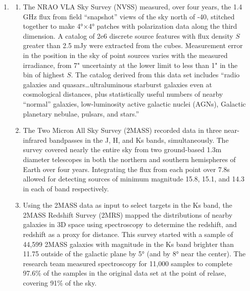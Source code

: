 \documentclass{paper}
\begin{document}
\begin{enumerate}
  \pagebreak \item
    \begin{enumerate}
      \item
        The NRAO VLA Sky Survey (NVSS) measured, over four years, the 1.4 
        GHz flux from field ``snapshot'' views of the sky north of -40, 
        stitched together to make 4°×4° patches with polarization data along 
        the third dimension. A catalog of 2e6 discrete source features with 
        flux density $S$ greater than 2.5 mJy were extracted from the cubes. 
        Measurement error in the position in the sky of point sources varies 
        with the measured irradiance, from 7" uncertainty at the lower limit 
        to less than 1" in the bin of highest $S$. The catalog derived from
        this data set includes ``radio galaxies and quasars\ldots ultraluminous 
        starburst galaxies even at cosmological distances, plus statistically 
        useful numbers of nearby ``normal'' galaxies, low-luminosity 
        active galactic nuclei (AGNs), Galactic planetary nebulae, pulsars, 
        and stars.''\cite{Condon_1998}

      \item
        The Two Micron All Sky Survey (2MASS) recorded data in three 
        near-infrared bandpasses in the J, H, and Ks bands, simultaneously. 
        The survey covered nearly the entire sky from two ground-based 1.3m 
        diameter telescopes in both the northern and southern hemispheres of
        Earth over four years. Integrating the flux from each point over 7.8s 
        allowed for detecting sources of minimum magnitude 15.8, 15.1, and 
        14.3 in each of band respectively.\cite{Skrutskie_2006}

      \item
        Using the 2MASS data as input to select targets in the Ks band, the
        2MASS Redshift Survey (2MRS) mapped the distributions of nearby
        galaxies in 3D space using spectroscopy to determine the redshift, 
        and redshift as a proxy for distance. This survey started with a 
        sample of 44,599 2MASS galaxies with magnitude in the Ks band  
        brighter than 11.75 outside of the galactic plane by 5° (and by 8°
        near the center). The research team measured spectroscopy for 11,000
        samples to complete 97.6\% of the samples in the original data set at 
        the point of relase, covering 91\% of the sky.\cite{Huchra_2012}

    \end{enumerate}


\end{enumerate}
\end{document}

